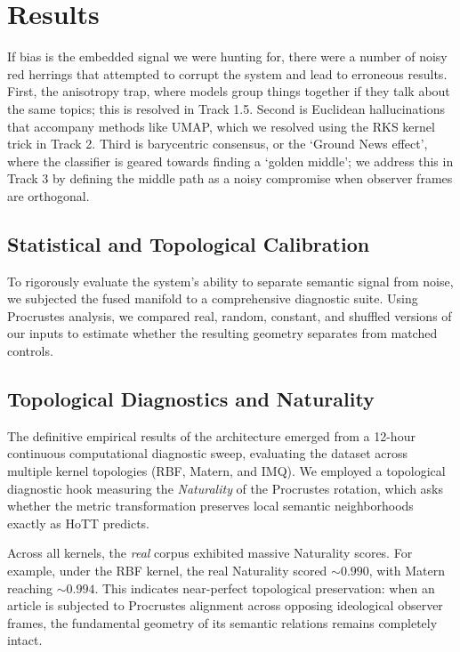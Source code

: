 \section{Results}

If bias is the embedded signal we were hunting for, there were a number of noisy red herrings that attempted to corrupt the system and lead to erroneous results. First, the anisotropy trap, where models group things together if they talk about the same topics; this is resolved in Track 1.5. Second is Euclidean hallucinations that accompany methods like UMAP, which we resolved using the RKS kernel trick in Track 2. Third is barycentric consensus, or the `Ground News effect', where the classifier is geared towards finding a `golden middle'; we address this in Track 3 by defining the middle path as a noisy compromise when observer frames are orthogonal.

\subsection{Statistical and Topological Calibration}

To rigorously evaluate the system's ability to separate semantic signal from noise, we subjected the fused manifold to a comprehensive diagnostic suite. Using Procrustes analysis, we compared real, random, constant, and shuffled versions of our inputs to estimate whether the resulting geometry separates from matched controls.


\subsection{Topological Diagnostics and Naturality}

The definitive empirical results of the architecture emerged from a 12-hour continuous computational diagnostic sweep, evaluating the dataset across multiple kernel topologies (RBF, Matern, and IMQ). We employed a topological diagnostic hook measuring the \emph{Naturality} of the Procrustes rotation, which asks whether the metric transformation preserves local semantic neighborhoods exactly as HoTT predicts.

Across all kernels, the \emph{real} corpus exhibited massive Naturality scores. For example, under the RBF kernel, the real Naturality scored $\sim 0.990$, with Matern reaching $\sim 0.994$. This indicates near-perfect topological preservation: when an article is subjected to Procrustes alignment across opposing ideological observer frames, the fundamental geometry of its semantic relations remains completely intact. 

